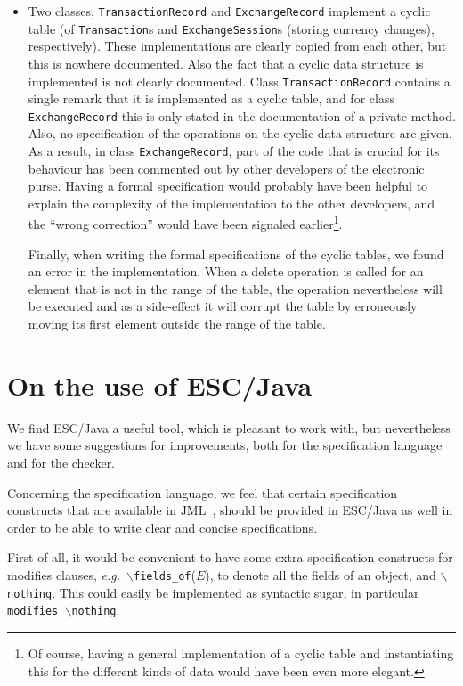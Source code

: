 \documentclass[a4paper]{llncs}
\newcommand{\noth}{\(\backslash\)\texttt{nothing}}
\newcommand{\fieldsof}{\(\backslash\)\texttt{fields\_of}}
\begin{document}
\begin{itemize}
\item Two classes, \texttt{TransactionRecord} and
\texttt{ExchangeRecord} implement a cyclic table (of
\texttt{Transaction}s and
\texttt{ExchangeSession}s (storing currency changes),
respectively).  These implementations are clearly copied from each
other, but this is nowhere documented. Also the fact that a
cyclic data structure is implemented is not clearly documented. Class
\texttt{TransactionRecord} contains a single remark that it is
implemented as a cyclic table, and for class
\texttt{ExchangeRecord} this is only stated in the documentation of a
private method. Also, no specification of the operations on the cyclic
data structure are given.
As a result, in class \texttt{ExchangeRecord}, part of the code that
is crucial for its behaviour has been commented out by other
developers of the electronic purse. Having a formal specification
would probably have been helpful to explain the complexity of the
implementation to the other developers, and the ``wrong correction''
would have been signaled earlier\footnote{Of course, having a general 
implementation of a cyclic table and instantiating this for the
different kinds of data would have been even more elegant.}.

Finally, when writing the formal specifications of the cyclic tables,
we found an error in the implementation. When a delete operation is
called for an element that is not in the range of the table, the
operation nevertheless will be executed and as a side-effect it will
corrupt the table by erroneously moving its first element outside the
range of the table.
\end{itemize}

\section{On the use of ESC/Java}
\label{SectESC}
We find ESC/Java a useful tool, which is pleasant to work with, but
nevertheless we have some suggestions for improvements, both for the
specification language and for the checker.

Concerning the specification language, we feel that certain
specification constructs that are available in JML~\cite{LeavensBR99},
should be provided in ESC/Java as well in order to be able to write
clear and concise specifications. 

First of all, it would be convenient to have some extra specification
constructs for modifies clauses, \emph{e.g.}~\fieldsof(\(E\)), to denote all
the fields of an object, and \noth. This could easily be implemented
as syntactic sugar, in particular \texttt{modifies \noth}.
\end{document}
